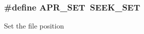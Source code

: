 \subsubsection[{\texorpdfstring{A\+P\+R\+\_\+\+S\+ET}{APR_SET}}]{\setlength{\rightskip}{0pt plus 5cm}\#define A\+P\+R\+\_\+\+S\+ET~S\+E\+E\+K\+\_\+\+S\+ET}\hypertarget{group__apr__file__seek__flags_ga2fdf78845c897f69451d49e1e2b90ac9}{}\label{group__apr__file__seek__flags_ga2fdf78845c897f69451d49e1e2b90ac9}
Set the file position 